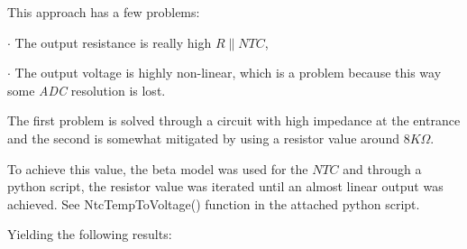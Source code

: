 \documentclass[12pt]{article}
\begin{document}
    This approach  has a few problems: 

    $\cdot$ The output resistance is really high $R\parallel NTC$, 

    $\cdot$ The output voltage is highly non-linear, which is a problem because this way some \textit{ADC} resolution is lost.

    The first problem is solved through a circuit with high impedance at the entrance and the second is somewhat mitigated by using a resistor value around $8K \Omega$. 

    To achieve this value, the beta model was used for the $NTC$ and through a python script, the resistor value was iterated until an almost linear output was achieved. See NtcTempToVoltage() function in the attached python script.
    ~
    
    Yielding the following results:
    \label{AFENTCOutV}
    ~
\end{document}
